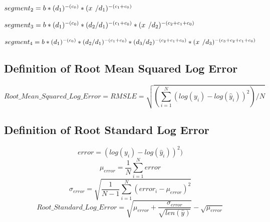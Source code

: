 \documentclass{article} %
\begin{document}
$segment_2 = b * (d_1)^{-(c_0)} * (x\hspace{.14cm}/d_1)^{-(c_1+c_0)}$

$segment_3 = b * (d_1)^{-(c_0)} * (d_2/d_1)^{-(c_1+c_0)} * (x\hspace{.14cm}/d_2)^{-(c_2+c_1+c_0)}$

$segment_4 = b * (d_1)^{-(c_0)} * (d_2/d_1)^{-(c_1+c_0)} * (d_3/d_2)^{-(c_2+c_1+c_0)} * (x\hspace{.14cm}/d_3)^{-(c_3+c_2+c_1+c_0)}$




\subsection{Definition of Root Mean Squared Log Error}
\label{section:definition_of_Root_Mean_Squared_Log_Error}

\[Root\_Mean\_Squared\_Log\_Error = RMSLE = \sqrt{(\sum_{i=1}^{N}(log(y_{i})-log(\hat{y}_{i}))^2)/N}\]

\subsection{Definition of Root Standard Log Error}
\label{section:definition_of_Root_Standard_Log_Error}

\[error = (log(y_{i})-log(\hat{y}_{i}))^2)\] 
\[\mu_{error} = \frac{1}{N}\sum_{i=1}^N error\]
\[\sigma_{error} = \sqrt{\frac{1}{N-1}\sum_{i=1}^N(error_i-\mu_{error})^2}\]
\[Root\_Standard\_Log\_Error = \sqrt{\mu_{error} + \frac{\sigma_{error}}{\sqrt{len(\hat{y})}}} - \sqrt{\mu_{error}}\] 

\end{document}
